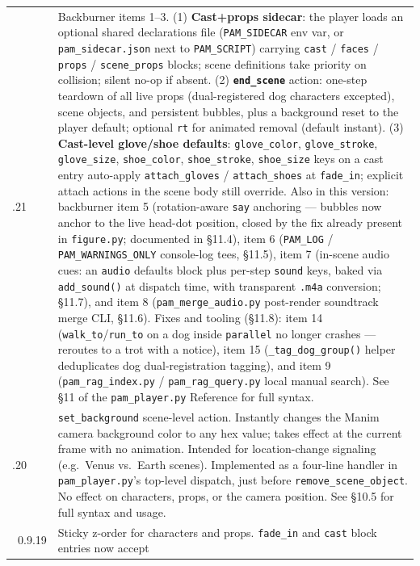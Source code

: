 \documentclass[
  11pt,
]{book}
\begin{document}
\begin{longtable}[]{@{}
  >{\raggedright\arraybackslash}p{}
  >{\raggedright\arraybackslash}p{}@{}}
0.9.21 & Backburner items 1--3. (1) \textbf{Cast+props sidecar}: the
player loads an optional shared declarations file (\texttt{PAM\_SIDECAR}
env var, or \texttt{pam\_sidecar.json} next to \texttt{PAM\_SCRIPT})
carrying \texttt{cast} / \texttt{faces} / \texttt{props} /
\texttt{scene\_props} blocks; scene definitions take priority on
collision; silent no-op if absent. (2) \textbf{\texttt{end\_scene}}
action: one-step teardown of all live props (dual-registered dog
characters excepted), scene objects, and persistent bubbles, plus a
background reset to the player default; optional \texttt{rt} for
animated removal (default instant). (3) \textbf{Cast-level glove/shoe
defaults}: \texttt{glove\_color}, \texttt{glove\_stroke},
\texttt{glove\_size}, \texttt{shoe\_color}, \texttt{shoe\_stroke},
\texttt{shoe\_size} keys on a cast entry auto-apply
\texttt{attach\_gloves} / \texttt{attach\_shoes} at \texttt{fade\_in};
explicit attach actions in the scene body still override. Also in this
version: backburner item 5 (rotation-aware \texttt{say} anchoring ---
bubbles now anchor to the live head-dot position, closed by the fix
already present in \texttt{figure.py}; documented in §11.4), item 6
(\texttt{PAM\_LOG} / \texttt{PAM\_WARNINGS\_ONLY} console-log tees,
§11.5), item 7 (in-scene audio cues: an \texttt{audio} defaults block
plus per-step \texttt{sound} keys, baked via \texttt{add\_sound()} at
dispatch time, with transparent \texttt{.m4a} conversion; §11.7), and
item 8 (\texttt{pam\_merge\_audio.py} post-render
soundtrack merge CLI, §11.6). Fixes and tooling (§11.8): item 14
(\texttt{walk\_to}/\texttt{run\_to} on a dog inside \texttt{parallel}
no longer crashes --- reroutes to a trot with a notice), item 15
(\texttt{\_tag\_dog\_group()} helper deduplicates dog dual-registration
tagging), and item 9 (\texttt{pam\_rag\_index.py} /
\texttt{pam\_rag\_query.py} local manual search). See §11 of
the \texttt{pam\_player.py} Reference for full syntax. \\
0.9.20 & \texttt{set\_background} scene-level action. Instantly changes
the Manim camera background color to any hex value; takes effect at the
current frame with no animation. Intended for location-change signaling
(e.g.\ Venus vs.\ Earth scenes). Implemented as a four-line handler in
\texttt{pam\_player.py}'s top-level dispatch, just before
\texttt{remove\_scene\_object}. No effect on characters, props, or the
camera position. See §10.5 for full syntax and usage. \\\
0.9.19 & Sticky z-order for characters and props.
\texttt{fade\_in} and \texttt{cast} block entries now accept

\end{longtable}
\end{document}
